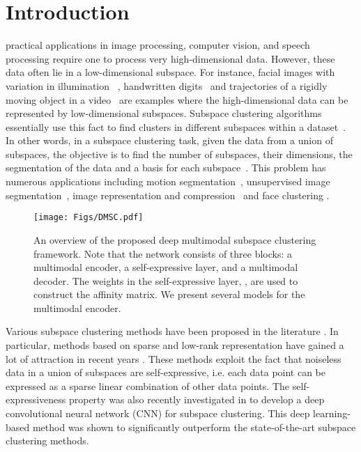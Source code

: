 \documentclass[journal]{IEEEtran}
\begin{document}
\IEEEpeerreviewmaketitle

\section{Introduction}\label{sec:intro}

 practical applications in image processing, computer vision, and speech processing require one to process very high-dimensional data.  However, these data often lie in a low-dimensional subspace.  For instance,  facial images with variation in illumination ~\cite{BasriJacobs},  handwritten digits~\cite{digitsDim} and trajectories of a rigidly moving object in a video~\cite{KanadeMotionSeg} are examples where the high-dimensional data can be represented by low-dimensional  subspaces.  Subspace clustering algorithms essentially use this fact to find clusters in different subspaces within a dataset~\cite{SC_vidal}.   In other words, in a subspace clustering task, given the data from a union of subspaces, the objective is to find the number of subspaces, their dimensions, the segmentation of the data and a basis for each subspace~\cite{SC_vidal}.  This problem has numerous applications including motion segmentation~\cite{wu2001multibody}, unsupervised image segmentation~\cite{yang2008unsupervised}, image representation and compression~\cite{hong2006multiscale} and face clustering \cite{ho2003clustering}.

\begin{figure}[t]
	\texttt{[image: Figs/DMSC.pdf]}
	\caption{An overview of the proposed deep multimodal subspace clustering framework.	Note that the network consists of three blocks: a multimodal encoder, a self-expressive layer, and a multimodal decoder.	The weights in the self-expressive layer, , are used to construct the affinity matrix. We present several models for the multimodal encoder.}	\label{fig:overvieww}
\end{figure}


Various subspace clustering methods have been proposed in the literature \cite{LLMC, LSA, SSC_CVPR, LRR, LRSC,li2015structured,you2016scalable,deepsc17nips,abavisani2018adversarial,abavisani2016domain,lu2012robust,ji2014efficient}.  In particular, methods based on sparse and low-rank representation have gained a lot of attraction in recent years \cite{SSC_PAMI, LRR_PAMI_2013,li2015structured,you2016scalable, latenst_SSC_LRR, Patel_KSSC_ICIP14, LRSSC_NIPS2013, zhang2015low}.   These methods exploit the fact that noiseless data in a union of subspaces are self-expressive, i.e. each data point can be expressed as a sparse linear combination of other data points.      The self-expressiveness property was also recently investigated in \cite{deepsc17nips} to develop a deep convolutional neural network (CNN) for subspace clustering.  This deep learning-based method was shown to significantly outperform the state-of-the-art subspace clustering methods.  
\end{document}
